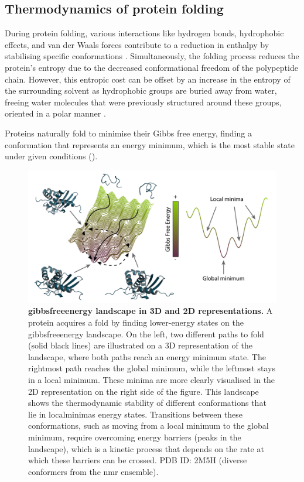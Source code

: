 \subsection{Thermodynamics of protein folding}
During protein folding, various interactions like hydrogen bonds, hydrophobic effects, and van der Waals forces contribute to a reduction in enthalpy by stabilising specific conformations \cite{santiago_relation_2010, liu_protein_2012}. Simultaneously, the folding process reduces the protein’s entropy due to the decreased conformational freedom of the polypeptide chain. However, this entropic cost can be offset by an increase in the entropy of the surrounding solvent as hydrophobic groups are buried away from water, freeing water molecules that were previously structured around these groups, oriented in a polar manner \cite{bonetti_analyzing_2017, bonetti_how_2018}.

Proteins naturally fold to minimise their Gibbs free energy, finding a conformation that represents an energy minimum, which is the most stable state under given conditions ().


\begin{figure}[tbh!]
    \centering
    \includegraphics[width=1\linewidth]{figures/energy_landscape.pdf}
    \caption{\textbf{\gls{gibbsfreeenergy} landscape in 3D and 2D representations.} A protein acquires a fold by finding lower-energy states on the \gls{gibbsfreeenergy} landscape. On the left, two different paths to fold (solid black lines) are illustrated on a 3D representation of the landscape, where both paths reach an energy minimum state. The rightmost path reaches the global minimum, while the leftmost stays in a local minimum. These minima are more clearly visualised in the 2D representation on the right side of the figure. This landscape shows the thermodynamic stability of different \glspl{conformation} that lie in \glspl{localminima} energy states. Transitions between these conformations, such as moving from a local minimum to the global minimum, require overcoming energy barriers (peaks in the landscape), which is a kinetic process that depends on the rate at which these barriers can be crossed. PDB ID: 2M5H \cite{ouyang_solution_2013} (diverse conformers from the \gls{nmr} ensemble).}
    \label{fig:chapter1:landscape}
\end{figure}

